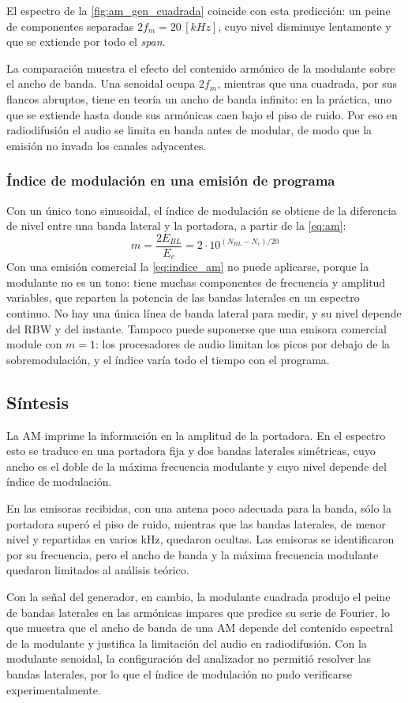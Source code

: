 El espectro de la \autoref{fig:am_gen_cuadrada} coincide con esta predicción: un peine de componentes separadas $2 f_m = 20 \, [kHz]$, cuyo nivel disminuye lentamente y que se extiende por todo el \textit{span}.

La comparación muestra el efecto del contenido armónico de la modulante sobre el ancho de banda. Una senoidal ocupa $2 f_m$, mientras que una cuadrada, por sus flancos abruptos, tiene en teoría un ancho de banda infinito: en la práctica, uno que se extiende hasta donde sus armónicas caen bajo el piso de ruido. Por eso en radiodifusión el audio se limita en banda antes de modular, de modo que la emisión no invada los canales adyacentes.

\subsubsection*{Índice de modulación en una emisión de programa}
Con un único tono sinusoidal, el índice de modulación se obtiene de la diferencia de nivel entre una banda lateral y la portadora, a partir de la \autoref{eq:am}:
\begin{equation}
    m = \frac{2 E_{BL}}{E_c} = 2 \cdot 10^{(N_{BL} - N_c)/20}
    \label{eq:indice_am}
\end{equation}
Con una emisión comercial la \autoref{eq:indice_am} no puede aplicarse, porque la modulante no es un tono: tiene muchas componentes de frecuencia y amplitud variables, que reparten la potencia de las bandas laterales en un espectro continuo. No hay una única línea de banda lateral para medir, y su nivel depende del RBW y del instante. Tampoco puede suponerse que una emisora comercial module con $m = 1$: los procesadores de audio limitan los picos por debajo de la sobremodulación, y el índice varía todo el tiempo con el programa.

\subsection{Síntesis}
La AM imprime la información en la amplitud de la portadora. En el espectro esto se traduce en una portadora fija y dos bandas laterales simétricas, cuyo ancho es el doble de la máxima frecuencia modulante y cuyo nivel depende del índice de modulación.

En las emisoras recibidas, con una antena poco adecuada para la banda, sólo la portadora superó el piso de ruido, mientras que las bandas laterales, de menor nivel y repartidas en varios kHz, quedaron ocultas. Las emisoras se identificaron por su frecuencia, pero el ancho de banda y la máxima frecuencia modulante quedaron limitados al análisis teórico.

Con la señal del generador, en cambio, la modulante cuadrada produjo el peine de bandas laterales en las armónicas impares que predice su serie de Fourier, lo que muestra que el ancho de banda de una AM depende del contenido espectral de la modulante y justifica la limitación del audio en radiodifusión. Con la modulante senoidal, la configuración del analizador no permitió resolver las bandas laterales, por lo que el índice de modulación no pudo verificarse experimentalmente.